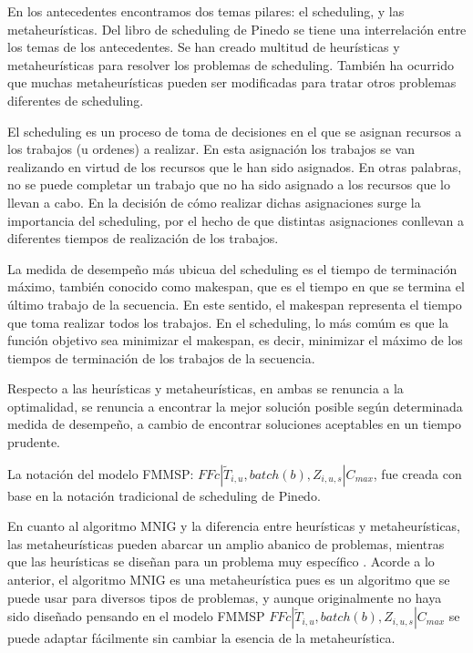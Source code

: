 \documentclass{article}
\def\notac_modelo{$FFc | \tilde{T}_{i, u}, batch(b), Z_{i, u, s} | C_{max}$}
\begin{document}
En los antecedentes encontramos dos temas pilares: el scheduling, y las metaheurísticas. Del libro de scheduling de Pinedo \autocite{schedPinedo} se tiene una interrelación entre los temas de los antecedentes. Se han creado multitud de heurísticas y metaheurísticas para resolver los problemas de scheduling. También ha ocurrido que muchas metaheurísticas pueden ser modificadas para tratar otros problemas diferentes de scheduling.

\vspace{\baselineskip}
El scheduling es un proceso de toma de decisiones en el que se asignan recursos a los trabajos (u ordenes) a realizar. En esta asignación los trabajos se van realizando en virtud de los recursos que le han sido asignados. En otras palabras, no se puede completar un trabajo que no ha sido asignado a los recursos que lo llevan a cabo. En la decisión de cómo realizar dichas asignaciones surge la importancia del scheduling, por el hecho de que distintas asignaciones conllevan a diferentes tiempos de realización de los trabajos. \autocite{schedPinedo}

\vspace{\baselineskip}
La medida de desempeño más ubicua del scheduling es el tiempo de terminación máximo, también conocido como makespan, que es el tiempo en que se termina el último trabajo de la secuencia. En este sentido, el makespan representa el tiempo que toma realizar todos los trabajos. En el scheduling, lo más comúm es que la función objetivo sea minimizar el makespan, es decir, minimizar el máximo de los tiempos de terminación de los trabajos de la secuencia. \autocite{schedPinedo}

\vspace{\baselineskip}
Respecto a las heurísticas y metaheurísticas, en ambas se renuncia a la optimalidad, se renuncia a encontrar la mejor solución posible según determinada medida de desempeño, a cambio de encontrar soluciones aceptables en un tiempo prudente. \autocite{metaTalbi}

\vspace{\baselineskip}
La notación del modelo FMMSP: \notac_modelo, fue creada con base en la notación tradicional de scheduling de Pinedo. \autocite{schedPinedo}

\vspace{\baselineskip}
En cuanto al algoritmo MNIG y la diferencia entre heurísticas y metaheurísticas, las metaheurísticas pueden abarcar un amplio abanico de problemas, mientras que las heurísticas se diseñan para un problema muy específico \autocite{metaTalbi}. Acorde a lo anterior, el algoritmo MNIG es una metaheurística pues es un algoritmo que se puede usar para diversos tipos de problemas, y aunque originalmente no haya sido diseñado pensando en el modelo FMMSP \linebreak \notac_modelo se puede adaptar fácilmente sin cambiar la esencia de la metaheurística.
\end{document}
